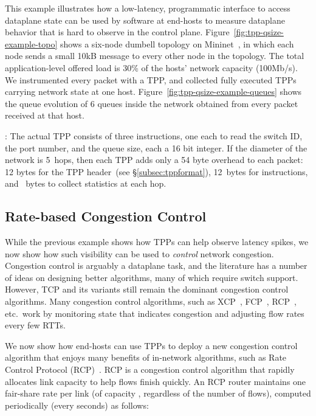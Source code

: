 This example illustrates how a low-latency,
programmatic interface to access dataplane state can be used by
software at end-hosts to measure dataplane behavior that is hard to
observe in the control plane.  Figure~\ref{fig:tpp-qsize-example-topo}
shows a six-node dumbell topology on
Mininet~\cite{handigol2012reproducible}, in which each node sends a
small 10kB message to every other node in the topology.  The total
application-level offered load is 30\% of the hosts' network capacity
(100Mb/s).  We instrumented every packet with a TPP, and collected
fully executed TPPs carrying network state at one host.
Figure~\ref{fig:tpp-qsize-example-queues} shows the queue evolution of
6 queues inside the network obtained from every packet received at
that host.

:  The actual TPP consists of three instructions,
one each to read the switch ID, the port number, and the queue size,
each a 16 bit integer.  If the diameter of the network is
5~hops, then each TPP adds only a 54 byte overhead to each
packet: 12 bytes for the TPP header~(see \S\ref{subsec:tppformat}),
12~bytes for instructions, and ~bytes to collect statistics
at each hop.

\subsection{Rate-based Congestion Control}\label{subsec:rcp}
While the previous example shows how TPPs can help observe latency
spikes, we now show how such visibility can be used to {\em control}
network congestion.  Congestion control is arguably a dataplane task,
and the literature has a number of ideas on designing better
algorithms, many of which require switch support.  However, TCP and
its variants still remain the dominant congestion control algorithms.
Many congestion control algorithms, such as
XCP~\cite{katabi2002congestion}, FCP~\cite{han2013fcp},
RCP~\cite{dukkipati2006flow}, etc.\ work by monitoring state that
indicates congestion and adjusting flow rates every few RTTs.

We now show how end-hosts can use TPPs to deploy a new congestion control
algorithm that enjoys many benefits of in-network algorithms, such as Rate Control Protocol
(RCP\@)~\cite{dukkipati2006flow}.  RCP is a congestion control algorithm
that rapidly allocates link capacity to help flows finish quickly.  An
RCP router maintains one fair-share rate  per link (of capacity
, regardless of the number of flows), computed periodically (every
 seconds) as follows:




